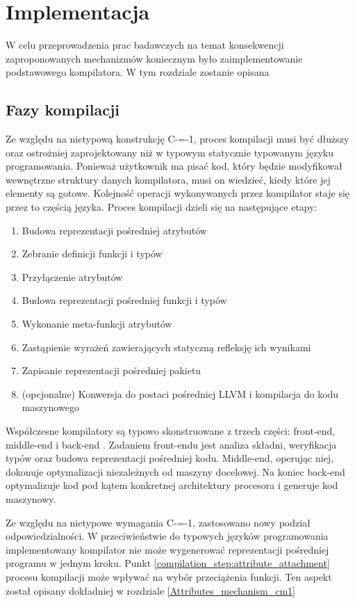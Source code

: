 \section{Implementacja}
W celu przeprowadzenia prac badawczych na temat konsekwencji zaproponowanych mechanizmów koniecznym było zaimplementowanie podstawowego kompilatora. 
W tym rozdziale zostanie opisana 

\subsection{Fazy kompilacji}
\label{Compilation_phases}
Ze względu na nietypową konstrukcję C-=-1, proces kompilacji musi być dłuższy oraz ostrożniej zaprojektowany niż w typowym statycznie typowanym języku programowania.
Ponieważ użytkownik ma pisać kod, który będzie modyfikował wewnętrzne struktury danych kompilatora, musi on wiedzieć, kiedy które jej elementy są gotowe.
Kolejność operacji wykonywanych przez kompilator staje się przez to częścią języka.
Proces kompilacji dzieli się na następujące etapy:
\begin{enumerate}
    \item Budowa reprezentacji pośredniej atrybutów
    \item Zebranie definicji funkcji i typów
    \item\label{compilation_step:attribute_attachment} Przyłączenie atrybutów
    \item Budowa reprezentacji pośredniej funkcji i typów
    \item Wykonanie meta-funkcji atrybutów
    \item Zastąpienie wyrażeń zawierających statyczną refleksję ich wynikami
    \item Zapisanie reprezentacji pośredniej pakietu
    \item (opcjonalne) Konwersja do postaci pośredniej LLVM i kompilacja do kodu maszynowego
\end{enumerate}

Współczesne kompilatory są typowo skonstruowane z trzech części: front-end, middle-end i back-end \cite{intro_to_compiler_design}.
Zadaniem front-endu jest analiza składni, weryfikacja typów oraz budowa reprezentacji pośredniej kodu. Middle-end, operując niej, dokonuje optymalizacji niezależnych od maszyny docelowej.
Na koniec back-end optymalizuje kod pod kątem konkretnej architektury procesora i generuje kod maszynowy.

Ze względu na nietypowe wymagania C-=-1, zastosowano nowy podział odpowiedzialności.
W przeciwieństwie do typowych języków programowania implementowany kompilator nie może wygenerować reprezentacji pośredniej programu w jednym kroku.
Punkt \ref{compilation_step:attribute_attachment} procesu kompilacji może wpływać na wybór przeciążenia funkcji.
Ten aspekt został opisany dokładniej w rozdziale \ref{Attributes_mechanism_cm1}

